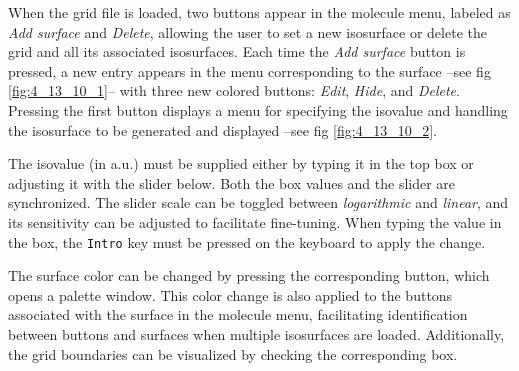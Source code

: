 \documentclass[10pt]{article}
\begin{document}
\vspace*{5mm}

When the grid file is loaded, two buttons appear in the molecule menu, labeled as
{\it Add surface} and {\it Delete}, allowing the user to set a new isosurface or delete the grid
and all its associated isosurfaces. Each time the {\it Add surface} button is pressed, a new entry appears in the menu corresponding to the surface --see fig \ref{fig:4_13_10_1}-- with three
new colored buttons: {\it Edit}, {\it Hide}, and {\it Delete}. Pressing the first button
displays a menu for specifying the isovalue and handling the isosurface to be generated and displayed
--see fig \ref{fig:4_13_10_2}.  

The isovalue (in a.u.) must be supplied 
either by typing it in the top box or adjusting it with the slider below. Both the box values
and the slider are synchronized. The slider scale can be toggled between {\it logarithmic}
and {\it linear}, and its sensitivity can be adjusted to facilitate fine-tuning.
When typing the value in the box, the \texttt{Intro} key must be 
pressed on the keyboard to apply the change. 

The surface color can be changed by pressing the 
corresponding button, which opens a palette window. This color change is also applied 
to the buttons associated with the surface in the molecule menu, facilitating
identification between buttons and surfaces when multiple isosurfaces are loaded.
Additionally, the grid boundaries can be visualized by checking the corresponding box.
\end{document}
